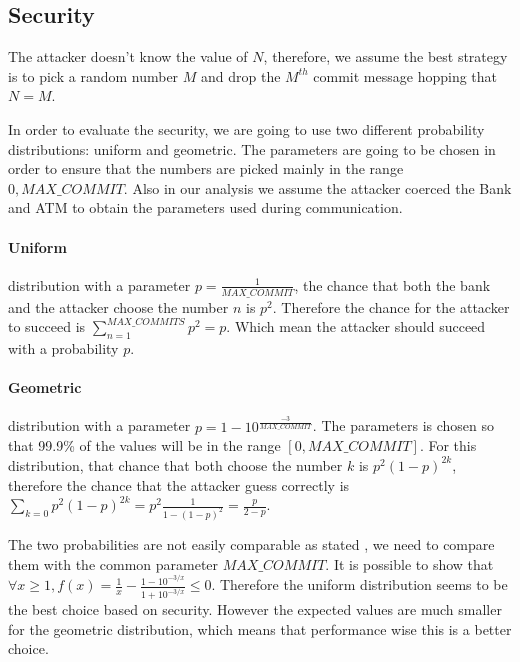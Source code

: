 \documentclass[10pt,letterpaper]{article}
\begin{document}
\begin{multicols}{2}
\subsection{Security}

The attacker doesn't know the value of $N$, therefore, we assume the best strategy is to pick a random number $M$ and drop the $M^{th}$ commit message hopping that $N = M$.

In order to evaluate the security, we are going to use two different probability distributions: uniform and geometric. The parameters are going to be chosen in order to ensure that the numbers are picked mainly
in the range $0, MAX\_COMMIT$. Also in our analysis we assume the attacker coerced the Bank and ATM to obtain the parameters used during communication.

\paragraph{Uniform} distribution with a parameter $p = \frac{1}{MAX\_COMMIT}$, the chance that both the bank and the attacker choose the number $n$ is $p^2$. Therefore the chance for the attacker to succeed is
$\sum_{n = 1}^{MAX\_COMMITS} p^2 = p$. Which mean the attacker should succeed with a probability $p$.

\paragraph{Geometric} distribution with a parameter $p = 1 - 10^{\frac{-3}{MAX\_COMMIT}}$. The parameters is chosen so that 99.9\% of the values will be in the range
$[0, MAX\_COMMIT]$. For this distribution, that chance that both choose the number $k$ is $p^2(1 - p)^{2k}$, therefore the chance that the attacker guess correctly is
$\sum_{k=0} p^2(1 - p)^{2k} = p^2\frac{1}{1 - (1 - p)^2} = \frac{p}{2 - p}$.

The two probabilities are not easily comparable as stated , we need to compare them with the common parameter $MAX\_COMMIT$. It is possible to show that $\forall x \ge 1,
f(x) = \frac{1}{x} - \frac{1 - 10^{-3/x}}{1 + 10^{-3/x}} \le 0$. Therefore the uniform distribution seems to be the best choice based on security. However the expected
values are much smaller for the geometric distribution, which means that performance wise this is a better choice.


\end{multicols}
\end{document}

